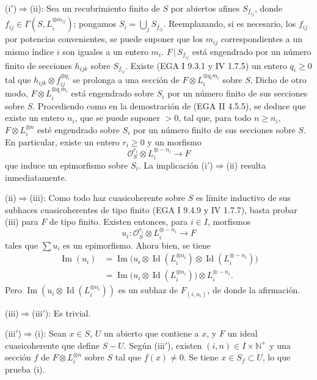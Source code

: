 (i$'$)$\Rightarrow$(ii): Sea un recubrimiento finito de $S$ por abiertos afines $S_{f_{ij}}$, donde $f_{ij}\in\Gamma(S,L_i^{\otimes m_{ij}})$; pongamos $S_i=\bigcup_j S_{f_{ij}}$. Reemplazando, si es necesario, los $f_{ij}$ por potencias convenientes, se puede suponer que los $m_{ij}$ correspondientes a un mismo índice $i$ son iguales a un entero $m_i$. $F\,|\,S_{f_{ij}}$ está engendrado por un número finito de secciones $h_{ijk}$ sobre $S_{f_{ij}}$. Existe (EGA I 9.3.1 y IV 1.7.5) un entero $q_i\ge0$ tal que $h_{ijk}\otimes f_{ij}^{\otimes q_i}$ se prolonga a una sección de $F\otimes L_i^{\otimes q_im_i}$ sobre $S$. Dicho de otro modo, $F\otimes L_i^{\otimes q_im_i}$ está engendrado sobre $S_i$ por un número finito de sus secciones sobre $S$. Procediendo como en la demostración de (EGA II 4.5.5), se deduce que existe un entero $n_i$, que se puede suponer $>0$, tal que, para todo $n\ge n_i$, $F\otimes L_i^{\otimes n}$ esté engendrado sobre $S_i$ por un número finito de sus secciones sobre $S$. En particular, existe un entero $r_i\ge0$ y un morfismo
\[
\mathcal O_S^{r_i}\otimes L_i^{\otimes-n_i}\longrightarrow F
\]
que induce un epimorfismo sobre $S_i$. La implicación (i$'$)$\Rightarrow$(ii) resulta inmediatamente.

(ii)$\Rightarrow$(iii): Como todo haz cuasicoherente sobre $S$ es límite inductivo de sus subhaces cuasicoherentes de tipo finito (EGA I 9.4.9 y IV 1.7.7), basta probar (iii) para $F$ de tipo finito. Existen entonces, para $i\in I$, morfismos
\[
u_i:\mathcal O_S^{r_i}\otimes L_i^{\otimes-n_i}\longrightarrow F
\]
tales que $\sum u_i$ es un epimorfismo. Ahora bien, se tiene
\[
\begin{aligned}
\operatorname{Im}(u_i)&=\operatorname{Im}\bigl(u_i\otimes\operatorname{Id}(L_i^{\otimes n_i})\otimes\operatorname{Id}(L_i^{\otimes-n_i})\bigr)\\
&=\operatorname{Im}\bigl(u_i\otimes\operatorname{Id}(L_i^{\otimes n_i})\bigr)\otimes L_i^{\otimes-n_i}.
\end{aligned}
\]
Pero $\operatorname{Im}(u_i\otimes\operatorname{Id}(L_i^{\otimes n_i}))$ es un subhaz de $F_{(i,n_i)}$, de donde la afirmación.

(iii)$\Rightarrow$(iii$'$): Es trivial.

(iii$'$)$\Rightarrow$(i): Sean $x\in S$, $U$ un abierto que contiene a $x$, y $F$ un ideal cuasicoherente que define $S-U$. Según (iii$'$), existen $(i,n)\in I\times\mathbb N^+$ y una sección $f$ de $F\otimes L_i^{\otimes n}$ sobre $S$ tal que $f(x)\ne0$. Se tiene $x\in S_f\subset U$, lo que prueba (i).

